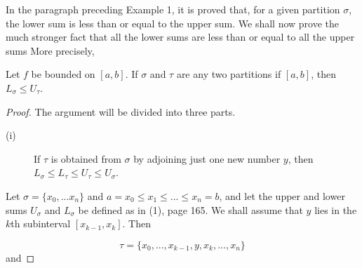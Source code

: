 In the paragraph preceding Example 1, it is proved that, for a given partition $\sigma$, the lower sum is less than or equal to the upper sum. We shall now prove the much stronger fact that all the lower sums are less than or equal to all the upper sums More precisely,

\begin{theorem} %
Let $f$ be bounded on $[a, b]$. If $\sigma$ and $\tau$ are any two partitions if $[a, b]$, then $L_{\sigma} \leq U_{\tau}$.
\end{theorem}

\begin{proof}
The argument will be divided into three parts.

\begin{description}
\item[(i)] If $\tau$ is obtained from $\sigma$ by adjoining just one new number $y$, then $L_{\sigma} \leq L_{\tau} \leq U_{\tau}
\leq U_{\sigma}$.

\end{description}
 
Let $\sigma = \{ x_0, . . . x_n \}$ and $a = x_0 \leq x_1 \leq ... \leq x_n = b$, and let the upper and lower sums $U_{\sigma}$ and $L_{\sigma}$ be defined as in (1), page 165. We shall assume that $y$ lies in the $k$th subinterval $[x_{k-1}, x_k]$.  Then

$$
\tau = \{ x_0, ..., x_{k-1}, y, x_k, ..., x_n \}
$$
\noindent and 


\end{proof}
